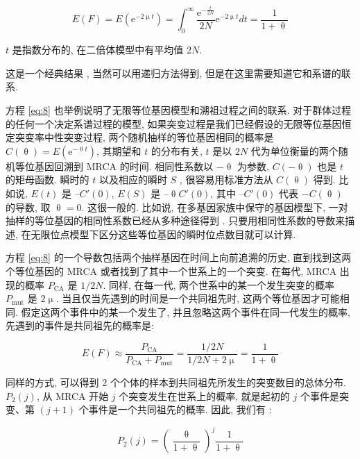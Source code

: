 \documentclass[12pt]{article}
\begin{document}
\begin{equation} \label{eq:8}
    E(F) = E(\mathrm{e}^{-2\upmu t}) = \int_{0}^{\infty} \frac{\mathrm{e}^{-\frac{t}{2N}}}{2N}\mathrm{e}^{-2\upmu t} dt = \frac{1}{1+\uptheta}
\end{equation}

$t$ 是指数分布的, 在二倍体模型中有平均值 $2N$.

这是一个经典结果 \parencite{kimura1964}, 当然可以用递归方法得到, 但是在这里需要知道它和系谱的联系.

方程 \ref{eq:8} 也举例说明了无限等位基因模型和溯祖过程之间的联系. 对于群体过程的任何一个决定系谱过程的模型,
如果突变过程是我们已经假设的无限等位基因恒定突变率中性突变过程, 两个随机抽样的等位基因相同的概率是 $C(\uptheta
)=E(\mathrm{e}^{-\uptheta t})$, 其期望和 $t$ 的分布有关, $t$ 是以 $2N$ 代为单位衡量的两个随机等位基因回溯到 MRCA
的时间. 相同性系数以 $-\uptheta$ 为参数, $C(-\uptheta )$ 也是 $t$ 的矩母函数.
瞬时的 $t$ 以及相应的瞬时 $S$ , 很容易用标准方法从 $C(\uptheta )$ 得到. 比如说, $E(t)$ 是 $–C'(0)$, $E(S)$ 是
$–\uptheta C'(0)$, 其中 $–C'(0)$ 代表 $-C(\uptheta )$ 的导数, 取 $\uptheta = 0$. 这很一般的. 比如说,
在多基因家族中保守的基因模型下, 一对抽样的等位基因的相同性系数已经从多种途径得到 \parencite{nagylaki1982}.
只要用相同性系数的导数来描述, 在无限位点模型下区分这些等位基因的瞬时位点数目就可以计算.

方程 \ref{eq:8} 的一个导数包括两个抽样基因在时间上向前追溯的历史, 直到找到这两个等位基因的 MRCA
或者找到了其中一个世系上的一个突变. 在每代, MRCA 出现的概率 $P_{\text{CA}}$ 是 $1/2N$. 同样, 在每一代,
两个世系中的某一个发生突变的概率 $P_{\text{mut}}$ 是 $2\upmu$. 当且仅当先遇到的时间是一个共同祖先时,
这两个等位基因才可能相同. 假定这两个事件中的某一个发生了, 并且忽略这两个事件在同一代发生的概率,
先遇到的事件是共同祖先的概率是:

\begin{equation} \label{eq:9}
    E(F) \approx \frac{P_{\text{CA}}}{P_{\text{CA}}+P_{\text{mut}}}=\frac{1/2N}{1/2N+2\upmu }=\frac{1}{1+\uptheta }
\end{equation}

同样的方式, 可以得到 2 个个体的样本到共同祖先所发生的突变数目的总体分布. $P_{2}(j)$, 从 MRCA 开始 $j$
个突变发生在世系上的概率, 就是起初的 $j$ 个事件是突变、第 $(j+1)$ 个事件是一个共同祖先的概率. 因此, 我们有
\parencite{watterson1975}:

\begin{equation} \label{eq:10}
    P_{2}(j)=\left (\frac{\uptheta}{1+\uptheta}\right )^{j}\frac{1}{1+\uptheta}
\end{equation}
\end{document}
